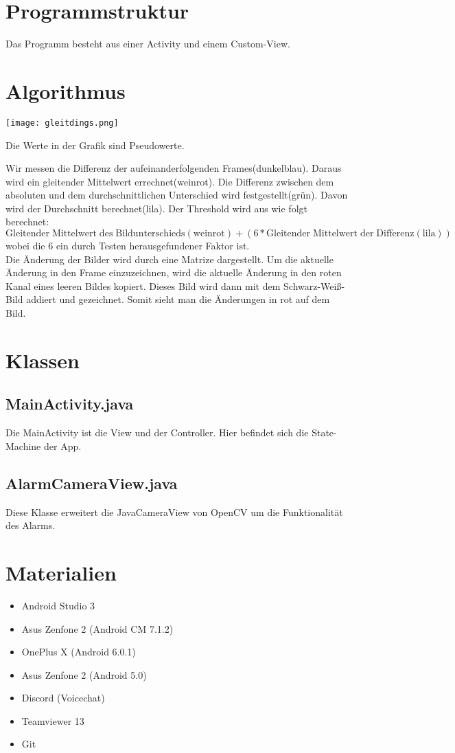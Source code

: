 \documentclass[11pt]{article}
\begin{document}
\section{Programmstruktur}
Das Programm besteht aus einer Activity und einem Custom-View.
\section{Algorithmus}
\texttt{[image: gleitdings.png]}
\begin{center}
	\tiny Die Werte in der Grafik sind Pseudowerte.
\end{center}
Wir messen die Differenz der aufeinanderfolgenden Frames(dunkelblau). Daraus wird ein gleitender Mittelwert errechnet(weinrot). Die Differenz zwischen dem absoluten und dem durchschnittlichen Unterschied wird festgestellt(gr{\"u}n). Davon wird der Durchschnitt berechnet(lila). Der Threshold wird aus wie folgt berechnet:
\[ \mathrm{Gleitender\; Mittelwert\; des\; Bildunterschieds (weinrot)} + (6 * \mathrm{Gleitender\; Mittelwert\; der\; Differenz (lila)}) \]
wobei die 6 ein durch Testen herausgefundener Faktor ist.\\
Die {\"A}nderung der Bilder wird durch eine Matrize dargestellt. Um die aktuelle {\"A}nderung in den Frame einzuzeichnen, wird die aktuelle {\"A}nderung in den roten Kanal eines leeren Bildes kopiert. Dieses Bild wird dann mit dem Schwarz-Wei\ss-Bild addiert und gezeichnet. Somit sieht man die {\"A}nderungen in rot auf dem Bild.
\section{Klassen}
\subsection{MainActivity.java}
Die MainActivity ist die View und der Controller. Hier befindet sich die State-Machine der App.
\subsection{AlarmCameraView.java}
Diese Klasse erweitert die JavaCameraView von OpenCV um die Funktionalit{\"a}t des Alarms.
\section{Materialien}
\begin{itemize}
	\item Android Studio 3
	\item Asus Zenfone 2 (Android CM 7.1.2)
	\item OnePlus X (Android 6.0.1)
	\item Asus Zenfone 2 (Android 5.0)
	\item Discord (Voicechat)
	\item Teamviewer 13
	\item Git
\end{itemize}
\end{document}
